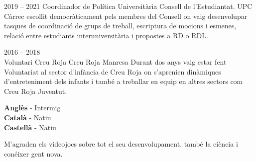 \documentclass[9pt]{developercv} %
\begin{document}
\begin{entrylist}
	\entry
	{2019 -- 2021}
	{Coordinador de Política Universitària}
	{Consell de l'Estudiantat. UPC}
	{ Càrrec escollit democràticament pels membres del Consell on vaig desenvolupar tasques de
	coordinació de grups de treball, escriptura de mocions i esmenes, relació entre estudiants
	interuniversitària i propostes a RD o RDL.
	\\ }

	\entry
	{2016 -- 2018\\}
	{Voluntari Creu Roja}
	{Creu Roja Manresa}
	{Durant dos anys vaig estar fent Voluntariat al sector d’infància de Creu Roja on s’aprenien
	dinàmiques d’entreteniment dels infants i també a treballar en equip en altres sectors com Creu
	Roja Juventut. \\ }
\end{entrylist}

\begin{minipage}[t]{0.3\textwidth}
	\vspace{-\baselineskip} %

	
	\textbf{Anglès} - Intermig\\
	\textbf{Català} - Natiu\\
	\textbf{Castellà} - Natiu
\end{minipage}
\hfill
\begin{minipage}[t]{0.3\textwidth}
	\vspace{-\baselineskip} %
	
	
   M'agraden els videojocs sobre tot el seu desenvolupament, també la ciència i conéixer gent nova.
	
\end{minipage}
\hfill

\end{document}
